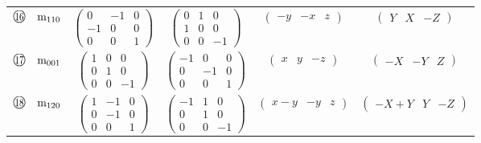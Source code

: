 \documentclass[fleqn,10pt,landscape]{jsarticle}
\begin{document}
\begin{center}
\begin{longtable}{lcccc}
$ {\ooalign{\hfil\resizebox{.8\width}{\height}{16}\hfil\crcr\raise.1ex\hbox{\large$\bigcirc$}}}\quad {\rm m}_{110} $ & $ \begin{pmatrix} 0 & -1 & 0 \\ -1 & 0 & 0 \\ 0 & 0 & 1 \end{pmatrix} $ & $ \begin{pmatrix} 0 & 1 & 0 \\ 1 & 0 & 0 \\ 0 & 0 & -1 \end{pmatrix} $ & $ \begin{pmatrix} - y & - x & z \end{pmatrix} $ & $ \begin{pmatrix} Y & X & - Z \end{pmatrix} $ \\
$ {\ooalign{\hfil\resizebox{.8\width}{\height}{17}\hfil\crcr\raise.1ex\hbox{\large$\bigcirc$}}}\quad {\rm m}_{001} $ & $ \begin{pmatrix} 1 & 0 & 0 \\ 0 & 1 & 0 \\ 0 & 0 & -1 \end{pmatrix} $ & $ \begin{pmatrix} -1 & 0 & 0 \\ 0 & -1 & 0 \\ 0 & 0 & 1 \end{pmatrix} $ & $ \begin{pmatrix} x & y & - z \end{pmatrix} $ & $ \begin{pmatrix} - X & - Y & Z \end{pmatrix} $ \\
$ {\ooalign{\hfil\resizebox{.8\width}{\height}{18}\hfil\crcr\raise.1ex\hbox{\large$\bigcirc$}}}\quad {\rm m}_{120} $ & $ \begin{pmatrix} 1 & -1 & 0 \\ 0 & -1 & 0 \\ 0 & 0 & 1 \end{pmatrix} $ & $ \begin{pmatrix} -1 & 1 & 0 \\ 0 & 1 & 0 \\ 0 & 0 & -1 \end{pmatrix} $ & $ \begin{pmatrix} x - y & - y & z \end{pmatrix} $ & $ \begin{pmatrix} - X + Y & Y & - Z \end{pmatrix} $ \\

\end{longtable}
\end{center}
\end{document}
